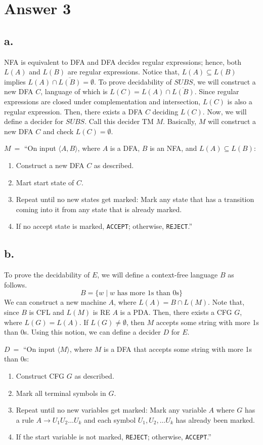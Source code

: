 \documentclass[12pt]{article}
\begin{document}
\section*{Answer 3}

\subsection*{a.} 

NFA is equivalent to DFA and DFA decides regular expressions; hence, both $L(A)$ and $L(B)$ are regular expressions. Notice that, $L(A) \subseteq L(B)$ implies $L(A) \cap \overline{L(B)} = \emptyset$. To prove decidability of $SUBS$, we will construct a new DFA $C$, language of which is $L(C) = L(A) \cap \overline{L(B)}$. Since regular expressions are closed under complementation and intersection, $L(C)$ is also a regular expression. Then, there exists a DFA $C$ deciding $L(C)$. Now, we will define a decider for $SUBS$. Call this decider TM $M$. Basically, $M$ will construct a new DFA $C$ and check $L(C) = \emptyset$.


$M \ =$ ``On input $\langle A, B \rangle$, where $A$ is a DFA, $B$ is an NFA, and $L(A) \subseteq L(B)$:
\begin{enumerate}[leftmargin=2.50cm]
	\item Construct a new DFA $C$ as described.
	\item Mart start state of $C$.
	\item Repeat until no new states get marked: Mark any state that has a transition coming into it from any state that is already marked.
	\item If no accept state is marked, \texttt{ACCEPT}; otherwise, \texttt{REJECT}.”
\end{enumerate}


\subsection*{b.}

To prove the decidability of $E$, we will define a context-free language $B$ as follows.
\[B =\{w \mid w \text{ has more 1s than 0s}\}\]
We can construct a new machine $A$, where $L(A) = B \cap L(M)$. Note that, since $B$ is CFL and $L(M)$ is RE $A$ is a PDA. Then, there exists a CFG $G$, where $L(G) = L(A)$. If $L(G) \neq \emptyset$, then $M$ accepts some string with more 1s than 0s. Using this notion, we can define a decider $D$ for $E$.

$D \ =$ ``On input $\langle M \rangle$, where $M$ is a DFA that accepts some string with more 1s than 0s:
\begin{enumerate}[leftmargin=2.50cm]
	\item Construct CFG $G$ as described.
	\item Mark all terminal symbols in $G$.
	\item Repeat until no new variables get marked: Mark any variable $A$ where $G$ has a rule $A\rightarrow U_1U_2\ldots U_k$ and each symbol $U_1, U_2 , \ldots U_k$ has already been marked.
	\item If the start variable is not marked, \texttt{REJECT}; otherwise, \texttt{ACCEPT}.”
\end{enumerate}
\end{document}

